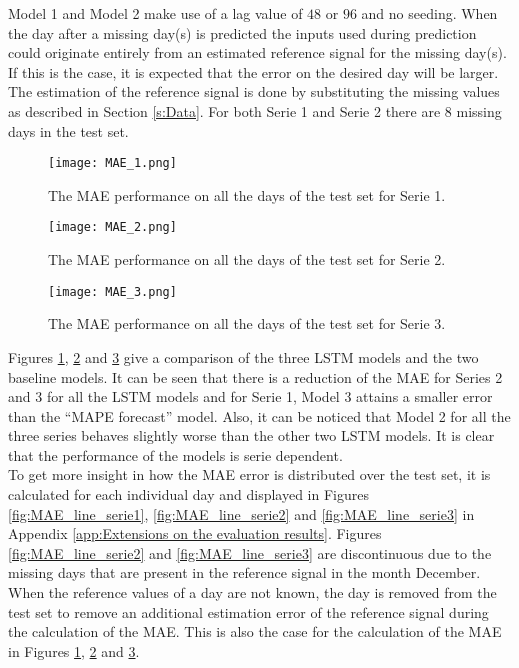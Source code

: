Model 1 and Model 2 make use of a lag value of $ 48 $ or $ 96 $ and no seeding. When the day after a missing day(s) is predicted the inputs used during prediction could originate entirely from an estimated reference signal for the missing day(s). If this is the case, it is expected that the error on the desired day will be larger. The estimation of the reference signal is done by substituting the missing values as described in Section \ref{s:Data}. For both Serie 1 and Serie 2 there are $ 8 $ missing days in the test set.

\begin{figure}[h]
	\centering
	\texttt{[image: MAE\_1.png]}
	\caption{The MAE performance on all the days of the test set for Serie 1.}
	\label{fig:MAE_serie1}
\end{figure}

\begin{figure}[h]
	\centering
	\texttt{[image: MAE\_2.png]}
	\caption{The MAE performance on all the days of the test set for Serie 2.}
	\label{fig:MAE_serie2}
\end{figure}	

\begin{figure}[h]
	\centering
	\texttt{[image: MAE\_3.png]}
	\caption{The MAE performance on all the days of the test set for Serie 3.}
	\label{fig:MAE_serie3}
\end{figure}	

Figures \ref{fig:MAE_serie1}, \ref{fig:MAE_serie2} and \ref{fig:MAE_serie3} give a comparison of the three LSTM models and the two baseline models. It can be seen that there is a reduction of the MAE for Series 2 and 3 for all the LSTM models and for Serie 1, Model 3 attains a smaller error than the ``MAPE forecast'' model. Also, it can be noticed that Model 2 for all the three series behaves slightly worse than the other two LSTM models. It is clear that the performance of the models is serie dependent.\\

To get more insight in how the MAE error is distributed over the test set, it is calculated for each individual day and displayed in Figures \ref{fig:MAE_line_serie1}, \ref{fig:MAE_line_serie2} and \ref{fig:MAE_line_serie3} in Appendix \ref{app:Extensions on the evaluation results}. Figures \ref{fig:MAE_line_serie2} and \ref{fig:MAE_line_serie3} are discontinuous due to the missing days that are present in the reference signal in the month December. When the reference values of a day are not known, the day is removed from the test set to remove an additional estimation error of the reference signal during the calculation of the MAE. This is also the case for the calculation of the MAE in Figures \ref{fig:MAE_serie1}, \ref{fig:MAE_serie2} and \ref{fig:MAE_serie3}. \\

